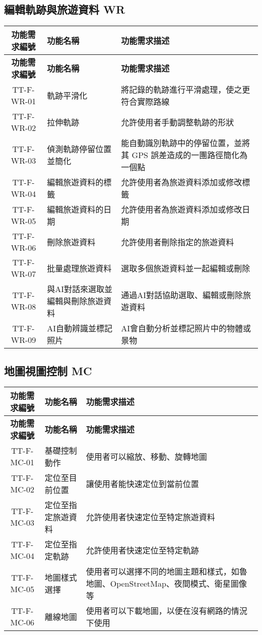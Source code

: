 \documentclass[12pt]{article}
\begin{document}
\subsection{編輯軌跡與旅遊資料 WR}

\begin{longtable}{|c|p{4.3cm}|p{8.9cm}|}
  \hline
  \textbf{功能需求編號} & \textbf{功能名稱} & \textbf{功能需求描述} \\
  \hline
  \endfirsthead
  \hline
  \textbf{功能需求編號} & \textbf{功能名稱} & \textbf{功能需求描述} \\
  \hline
  \endhead
  TT-F-WR-01 & 軌跡平滑化 & 將記錄的軌跡進行平滑處理，使之更符合實際路線 \\
  \hline
  TT-F-WR-02 & 拉伸軌跡 & 允許使用者手動調整軌跡的形狀 \\
  \hline
  TT-F-WR-03 & 偵測軌跡停留位置並簡化 & 能自動識別軌跡中的停留位置，並將其 GPS 誤差造成的一團路徑簡化為一個點 \\
  \hline
  TT-F-WR-04 & 編輯旅遊資料的標籤 & 允許使用者為旅遊資料添加或修改標籤 \\
  \hline
  TT-F-WR-05 & 編輯旅遊資料的日期 & 允許使用者為旅遊資料添加或修改日期 \\
  \hline
  TT-F-WR-06 & 刪除旅遊資料 & 允許使用者刪除指定的旅遊資料 \\
  \hline
  TT-F-WR-07 & 批量處理旅遊資料 & 選取多個旅遊資料並一起編輯或刪除 \\
  \hline
  TT-F-WR-08 & 與AI對話來選取並編輯與刪除旅遊資料 & 通過AI對話協助選取、編輯或刪除旅遊資料 \\
  \hline
  TT-F-WR-09 & AI自動辨識並標記照片 & AI會自動分析並標記照片中的物體或景物 \\
  \hline
\end{longtable}


\subsection{地圖視圖控制 MC}

\begin{longtable}{|c|p{4.3cm}|p{8.9cm}|}
  \hline
  \textbf{功能需求編號} & \textbf{功能名稱} & \textbf{功能需求描述} \\
  \hline
  \endfirsthead
  \hline
  \textbf{功能需求編號} & \textbf{功能名稱} & \textbf{功能需求描述} \\
  \hline
  \endhead
  TT-F-MC-01 & 基礎控制動作 & 使用者可以縮放、移動、旋轉地圖 \\
  \hline
  TT-F-MC-02 & 定位至目前位置 & 讓使用者能快速定位到當前位置 \\
  \hline
  TT-F-MC-03 & 定位至指定旅遊資料 & 允許使用者快速定位至特定旅遊資料 \\
  \hline
  TT-F-MC-04 & 定位至指定軌跡 & 允許使用者快速定位至特定軌跡 \\
  \hline
  TT-F-MC-05 & 地圖樣式選擇 & 使用者可以選擇不同的地圖主題和樣式，如魯地圖、OpenStreetMap、夜間模式、衛星圖像等 \\
  \hline
  TT-F-MC-06 & 離線地圖 & 使用者可以下載地圖，以便在沒有網路的情況下使用 \\
  \hline
\end{longtable}
\end{document}
